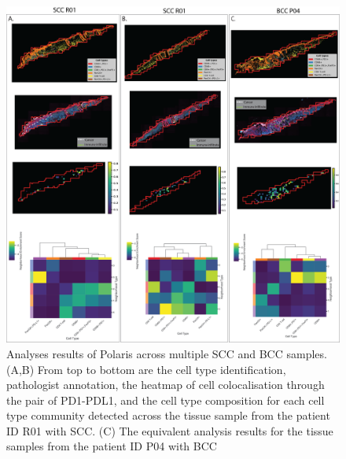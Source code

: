 \begin{figure}[htp]
\renewcommand{\figurename}{Figure}
    \centering
    \includegraphics[width=0.75\columnwidth]{Chapter3/Figures/Chap3_supple_figure_1.png}
    \caption[Analyses results of Polaris across multiple SCC and BCC samples]{Analyses results of Polaris across multiple SCC and BCC samples. (A,B) From top to bottom are the cell type identification, pathologist annotation, the heatmap of cell colocalisation through the pair of PD1-PDL1, and the cell type composition for each cell type community detected across the tissue sample from the patient ID R01 with SCC. (C) The equivalent analysis results for the tissue samples from the patient ID P04 with BCC}
    \label{fig:Chap3_figure6}
\end{figure}
